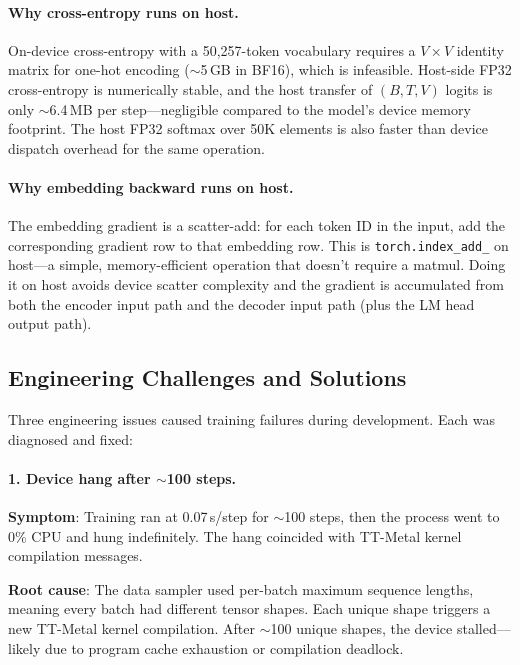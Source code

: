 \documentclass[11pt,a4paper]{article}
\begin{document}
\paragraph{Why cross-entropy runs on host.}
On-device cross-entropy with a 50,257-token vocabulary requires a $V \times V$ identity matrix for one-hot encoding ($\sim$5\,GB in BF16), which is infeasible. Host-side FP32 cross-entropy is numerically stable, and the host transfer of $(B, T, V)$ logits is only $\sim$6.4\,MB per step---negligible compared to the model's device memory footprint. The host FP32 softmax over 50K elements is also faster than device dispatch overhead for the same operation.

\paragraph{Why embedding backward runs on host.}
The embedding gradient is a scatter-add: for each token ID in the input, add the corresponding gradient row to that embedding row. This is \texttt{torch.index\_add\_} on host---a simple, memory-efficient operation that doesn't require a matmul. Doing it on host avoids device scatter complexity and the gradient is accumulated from both the encoder input path and the decoder input path (plus the LM head output path).

\subsection{Engineering Challenges and Solutions}
\label{sec:engineering}

Three engineering issues caused training failures during development. Each was diagnosed and fixed:

\paragraph{1. Device hang after $\sim$100 steps.}

\textbf{Symptom}: Training ran at 0.07\,s/step for $\sim$100 steps, then the process went to 0\% CPU and hung indefinitely. The hang coincided with TT-Metal kernel compilation messages.

\textbf{Root cause}: The data sampler used per-batch maximum sequence lengths, meaning every batch had different tensor shapes. Each unique shape triggers a new TT-Metal kernel compilation. After $\sim$100 unique shapes, the device stalled---likely due to program cache exhaustion or compilation deadlock.
\end{document}
